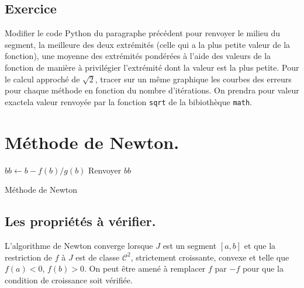 \subsection{Exercice}
Modifier le code Python du paragraphe précédent pour renvoyer le milieu du segment, la meilleure des deux extrémités (celle qui a la plus petite valeur de la fonction), une moyenne des extrémités pondérées à l'aide des valeurs de la fonction de manière à privilégier l'extrémité dont la valeur est la plus petite.\newline
Pour le calcul approché de $\sqrt{2}$, tracer sur un même graphique les courbes des erreurs pour chaque méthode en fonction du nombre d'itérations. On prendra pour valeur \og exacte\fg la valeur renvoyée par la fonction \texttt{sqrt} de la bibiothèque \texttt{math}.

\section{Méthode de Newton.}
\begin{algorithm}
  $bb \leftarrow b - f(b)/g(b)$\;  
  Renvoyer $bb$\;
  \caption{Méthode de Newton}
  \label{resolnumequ_2}
\end{algorithm}

\subsection{Les propriétés à vérifier.}
L'algorithme de Newton converge lorsque $J$ est un segment $[a,b]$ et que la restriction de $f$ à $J$ est de classe $\mathcal{C}^2$, strictement croissante, convexe et telle que $f(a)<0$, $f(b)>0$. On peut être amené à remplacer $f$ par $-f$ pour que la condition de croissance soit vérifiée. 

